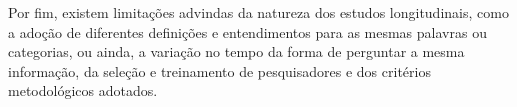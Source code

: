 Por fim, existem limitações advindas da natureza dos estudos longitudinais, como
a adoção de diferentes definições e entendimentos para as mesmas palavras ou categorias, ou ainda,
a variação no tempo da forma de perguntar a mesma informação, da seleção e treinamento de pesquisadores e dos critérios metodológicos adotados.

